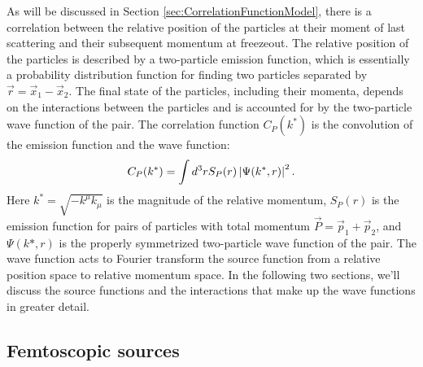 As will be discussed in Section \ref{sec:CorrelationFunctionModel}, there is a correlation between the relative position of the particles at their moment of last scattering and their subsequent momentum at freezeout.
The relative position of the particles is described by a two-particle emission function, which is essentially a probability distribution function for finding two particles separated by $\vec{r} = \vec{x}_1 - \vec{x}_2$.
The final state of the particles, including their momenta, depends on the interactions between the particles and is accounted for by the two-particle wave function of the pair.
The correlation function $C_P(k^*)$ is the convolution of the emission function and the wave function:
\begin{equation}
\label{eq:KooninPrattInIntro}
C_P(k^*) =  \int d^3r S_{P} (r) \left\lvert\Psi(k^*,r)\right\rvert^2.
\end{equation}
Here $k^* = \sqrt{-k^\mu k_\mu}$ is the magnitude of the relative momentum, $S_P(r)$ is the emission function for pairs of particles with total momentum $\vec{P} = \vec{p}_1 + \vec{p}_2$, and $\Psi(k*,r)$ is the properly symmetrized two-particle wave function of the pair.
The wave function acts to Fourier transform the source function from a relative position space to relative momentum space.
In the following two sections, we'll discuss the source functions and the interactions that make up the wave functions in greater detail.

\subsection{Femtoscopic sources}
\label{sec:FemtoSources}

